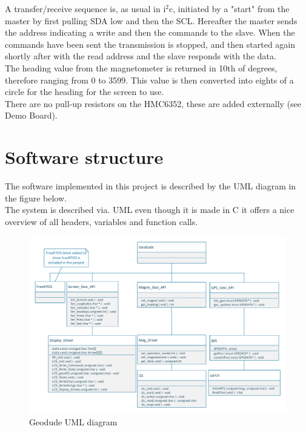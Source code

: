A transfer/receive sequence is, as usual in i$^2$c, initiated by a "start" from the master by first pulling SDA low and then the SCL. Hereafter the master sends the address indicating a write and then the commands to the slave. When the commands have been sent the transmission is stopped, and then started again shortly after with the read address and the slave responds with the data.\\
The heading value from the magnetometer is returned in 10th of degrees, therefore ranging from 0 to 3599. This value is then converted into eights of a circle for the heading for the screen to use.\\
There are no pull-up resistors on the HMC6352, these are added externally (see Demo Board).\\

\section{Software structure}
The software implemented in this project is described by the UML diagram in the figure below.\\
The system is described via. UML even though it is made in C it offers a nice overview of all headers, variables and function calls.\\

\begin{figure}[H]
\centering
\includegraphics[width=1\textwidth]{billeder/geodude_UML}
\caption{Geodude UML diagram}
\end{figure}

